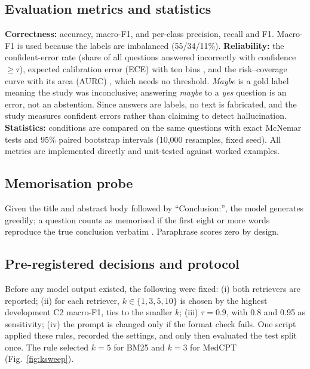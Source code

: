 \documentclass[conference]{IEEEtran}
\begin{document}
\subsection{Evaluation metrics and statistics}
\textbf{Correctness:} accuracy, macro-F1, and per-class precision, recall and
F1. Macro-F1 is used because the labels are imbalanced (55/34/11\%).
\textbf{Reliability:} the confident-error rate (share of all questions answered
incorrectly with confidence $\geq\tau$), expected calibration error (ECE) with
ten bins \cite{guo2017calibration}, and the risk--coverage curve with its area
(AURC) \cite{geifman2017selective}, which needs no threshold. \emph{Maybe} is a
gold label meaning the study was inconclusive; answering \emph{maybe} to a
\emph{yes} question is an error, not an abstention. Since answers are labels, no
text is fabricated, and the study measures confident errors rather than claiming
to detect hallucination. \textbf{Statistics:} conditions are compared on the same
questions with exact McNemar tests \cite{mcnemar1947} and 95\% paired bootstrap
intervals \cite{efron1993bootstrap} (10{,}000 resamples, fixed seed). All metrics
are implemented directly and unit-tested against worked examples.

\subsection{Memorisation probe}
Given the title and abstract body followed by ``Conclusion:'', the model
generates greedily; a question counts as memorised if the first eight or more
words reproduce the true conclusion verbatim \cite{carlini2021extracting}.
Paraphrase scores zero by design.

\subsection{Pre-registered decisions and protocol}
\label{sec:prereg}
Before any model output existed, the following were fixed: (i) both retrievers
are reported; (ii) for each retriever, $k\in\{1,3,5,10\}$ is chosen by the highest
development C2 macro-F1, ties to the smaller $k$; (iii) $\tau=0.9$, with 0.8 and
0.95 as sensitivity; (iv) the prompt is changed only if the format check fails.
One script applied these rules, recorded the settings, and only then evaluated
the test split once. The rule selected $k=5$ for BM25 and $k=3$ for MedCPT
(Fig.~\ref{fig:ksweep}).
\end{document}
